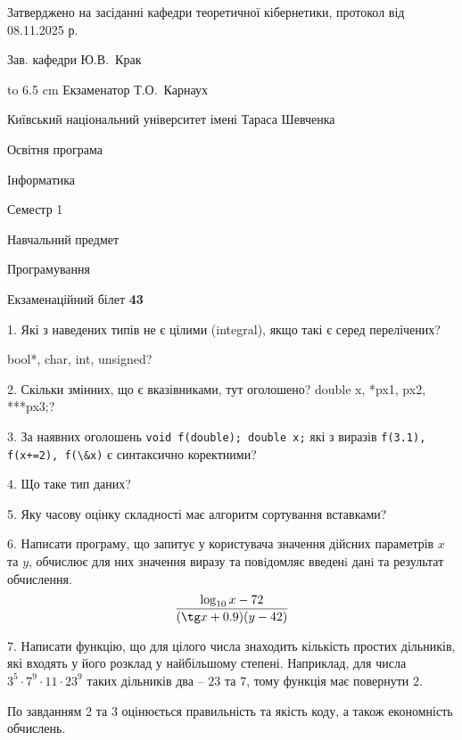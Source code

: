 \documentclass[12pt, ukrainian]{article}
\def\code#1{\Verb!#1!}
\begin{document}
{\smallskip\smallskip \begin {scriptsize} Затверджено на засіданні кафедри теоретичної кібернетики, протокол   від   08.11.2025 р.\par\smallskip\smallskip\smallskip\smallskip
{\parbox {6.5 cm} {Зав. кафедри \dotfill Ю.В.~Крак}}\hspace {0.7cm} {\hbox to 6.5 cm { Екзаменатор \dotfill Т.О.~Карнаух}} \end{scriptsize}}
\newpage
{{\begin {scriptsize}\par
{ \center  Київський національний університет імені Тараса Шевченка \par}
{\parbox {5 cm}{Освітня програма \hfill}{\parbox {7 cm}{Інформатика\hfill}}\parbox {6 cm}{\hfill Семестр 1}}\par
{\parbox {5 cm} {Навчальний предмет \hfill}\parbox {7 cm}{Програмування \hfill}\parbox {6cm}{\hfill}\par}\vspace{-15pt} \end{scriptsize}}{\center Екзаменаційний білет \No \textbf { 43 }\par}}
{%
1. Які з наведених типів не є цілими (integral), якщо такі є серед перелічених?

bool*, char, int, unsigned?
\par
\vspace{2mm}
2. Скільки змінних, що є вказівниками, тут оголошено?
double x, *px1, px2, ***px3;?
\par
\vspace{2mm}
3. За наявних оголошень \code{void f(double); double x;} які з виразів \code{f(3.1), f(x+=2), f(\&x)} є синтаксично коректними?
\par
\vspace{2mm}
4. Що таке тип даних?
\par
\vspace{2mm}
5. Яку часову оцінку складності має алгоритм сортування вставками?
\par
\vspace{2mm}
6. Написати програму, що запитує у користувача значення дійсних параметрів $x$ та $y$, обчислює для них значення виразу та повiдомляє введенi данi та результат обчислення.
$$\frac{\log_{10} x - 72}{(\tg x + 0.9) (y - 42)}$$ 

\par
7. Написати функцію, що для цілого числа знаходить кількість простих дільників, які входять у його розклад у найбільшому степені. Наприклад, для числа $3^5{\cdot}7^9{\cdot}11{\cdot}23^{9}$ таких дільників два – $23$ та $7$, тому функція має повернути $2$.

По завданням 2 та 3 оцінюється правильність та якість коду, а також економність обчислень.

}
\end{document}

